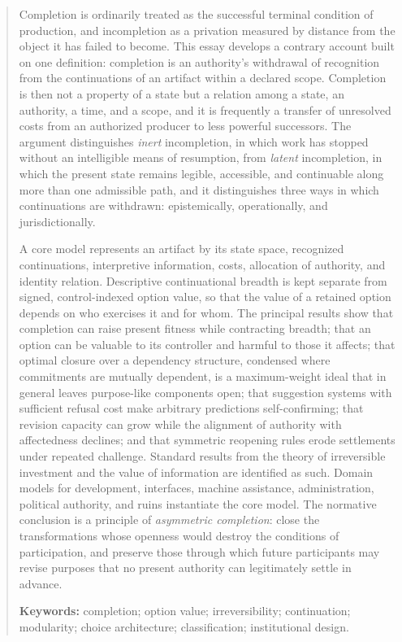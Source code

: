 \begin{abstract}
\noindent
Completion is ordinarily treated as the successful terminal condition of production, and incompletion as a privation measured by distance from the object it has failed to become. This essay develops a contrary account built on one definition: completion is an authority's withdrawal of recognition from the continuations of an artifact within a declared scope. Completion is then not a property of a state but a relation among a state, an authority, a time, and a scope, and it is frequently a transfer of unresolved costs from an authorized producer to less powerful successors. The argument distinguishes \emph{inert} incompletion, in which work has stopped without an intelligible means of resumption, from \emph{latent} incompletion, in which the present state remains legible, accessible, and continuable along more than one admissible path, and it distinguishes three ways in which continuations are withdrawn: epistemically, operationally, and jurisdictionally.

A core model represents an artifact by its state space, recognized continuations, interpretive information, costs, allocation of authority, and identity relation. Descriptive continuational breadth is kept separate from signed, control-indexed option value, so that the value of a retained option depends on who exercises it and for whom. The principal results show that completion can raise present fitness while contracting breadth; that an option can be valuable to its controller and harmful to those it affects; that optimal closure over a dependency structure, condensed where commitments are mutually dependent, is a maximum-weight ideal that in general leaves purpose-like components open; that suggestion systems with sufficient refusal cost make arbitrary predictions self-confirming; that revision capacity can grow while the alignment of authority with affectedness declines; and that symmetric reopening rules erode settlements under repeated challenge. Standard results from the theory of irreversible investment and the value of information are identified as such. Domain models for development, interfaces, machine assistance, administration, political authority, and ruins instantiate the core model. The normative conclusion is a principle of \emph{asymmetric completion}: close the transformations whose openness would destroy the conditions of participation, and preserve those through which future participants may revise purposes that no present authority can legitimately settle in advance.

\medskip\noindent\textbf{Keywords:} completion; option value; irreversibility; continuation; modularity; choice architecture; classification; institutional design.
\end{abstract}
